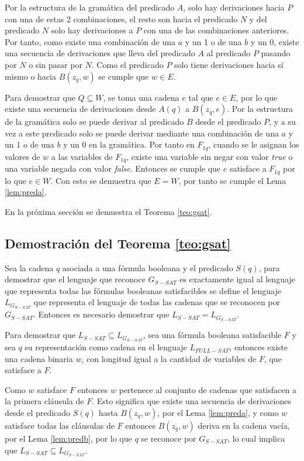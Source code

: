 \documentclass[12pt]{article}
\newcommand{\true}{\textit{true}}
\newcommand{\false}{\textit{false}}
\begin{document}
Por la estructura de la gramática del predicado $A$, solo hay derivaciones hacia $P$ con una de estas 2 combinaciones, el resto son hacia el predicado $N$ y del predicado $N$ solo hay derivaciones a $P$ con una de las combinaciones anteriores. Por tanto, como existe una combinación de una $a$ y un 1 o de una $b$ y un 0, existe una secuencia de derivaciones que lleva del predicado $A$ al predicado $P$ pasando por $N$ o sin pasar por $N$. Como el predicado $P$ solo tiene derivaciones hacia sí mismo o hacia $B(z_q,w)$ se cumple que $w\in E$.

Para demostrar que $Q\subseteq W$, se toma una cadena $e$ tal que $e\in E$, por lo que existe una secuencia de derivaciones desde $A(q)$ a $B(z_q,e)$. Por la estructura de la gramática solo se puede derivar al predicado $B$ desde el predicado $P$, y a su vez a este predicado solo se puede derivar mediante una combinación de una $a$ y un 1 o de una $b$ y un 0 en la gramática. Por tanto en $F_{1q}$, cuando se le asignan los valores de $w$ a las variables de $F_{1q}$, existe una variable 
sin negar con valor \true{} o una variable negada con valor \false{}.  Entonces se cumple que $e$ satisface a $F_{1q}$ por lo que $e\in W$. Con esto se demuestra que $E=W$, por tanto se cumple el Lema \ref{lem:preda}.

En la próxima sección se demuestra el Teorema \ref{teo:gsat}.

\subsection{Demostración del Teorema \ref{teo:gsat}}
Sea la cadena $q$ asociada a una fórmula booleana y el predicado $S(q)$, para demostrar que el lenguaje que reconoce $G_{S-SAT}$ es exactamente igual al lenguaje que representa todas las fórmulas booleanas satisfacibles se define el lenguaje $L_{G_{S-SAT}}$ que representa el lenguaje de todas las cadenas que se reconocen por $G_{S-SAT}$. Entonces es necesario demostrar que $L_{S-SAT}=L_{G_{S-SAT}}$.

Para demostrar que $L_{S-SAT}\subseteq L_{G_{S-SAT}}$, sea una fórmula booleana satisfacible $F$ y sea $q$ su representación como cadena en el lenguaje $L_{FULL-SAT}$, entonces existe una cadena binaria $w$, con longitud igual a la cantidad de variables de $F$, que satisface a $F$.

Como $w$ satisface $F$ entonces $w$ pertenece al conjunto de cadenas que satisfacen a la primera cláusula de $F$. Esto significa que existe una secuencia de derivaciones desde el predicado $S(q)$ hasta $B(z_q,w)$, por el Lema \ref{lem:preda}, y como $w$ satisface todas las cláusulas de $F$ entonces $B(z_q,w)$ deriva en la cadena vacía, por el Lema \ref{lem:predb}, por lo que $q$ se reconoce por $G_{S-SAT}$, lo cual implica que $L_{S-SAT}\subseteq L_{G_{S-SAT}}$.
\end{document}
